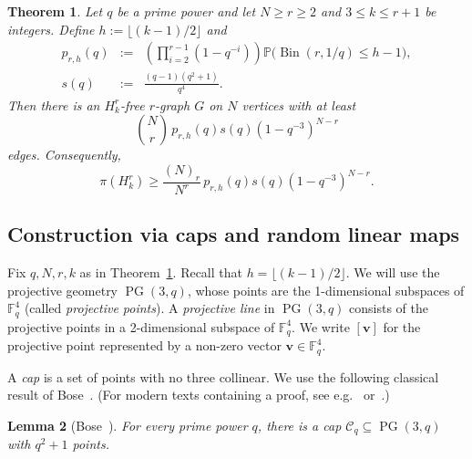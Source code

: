 \documentclass[10pt,a4paper]{article}
\numberwithin{equation}{section}
\newtheorem{theorem}{Theorem}[section]
\newtheorem{lemma}[theorem]{Lemma}
\theoremstyle{definition}
\theoremstyle{remark}
\newcommand{\V}[1]{\boldsymbol{#1}}
\begin{document}
\begin{theorem}\label{thm:poisson-finite}
	Let $q$ be a prime power and let $N\ge r\ge2$ and $3\le k\le r+1$ be integers. Define $h:=\lfloor (k-1)/2\rfloor$ and
	\begin{eqnarray*}
	p_{r,h}(q)&:=&\left(\prod_{i=2}^{r-1}(1-q^{-i})\right)
	\mathbb P\bigl(\operatorname{Bin}(r,1/q)\le h-1\bigr),\\
 s(q)&:=&\frac{(q-1)(q^2+1)}{q^4}.\end{eqnarray*} 
  Then there is an $H_k^r$-free $r$-graph $G$ on $N$ vertices with at least
	$$
	\binom Nr\,p_{r,h}(q)s(q)(1-q^{-3})^{N-r}
	$$
	edges. Consequently,
	\begin{equation}\label{eq:poisson-exact}
		\pi(H_k^r)\ge
		\frac{(N)_r}{N^r}\,p_{r,h}(q)s(q)(1-q^{-3})^{N-r}.
	\end{equation}
\end{theorem}

\subsection{Construction via caps and random linear maps}

Fix $q,N,r,k$ as in Theorem~\ref{thm:poisson-finite}. Recall that $h=\lfloor(k-1)/2\rfloor$. We will use the {projective geometry $\operatorname{PG}(3,q)$}, whose points are the 1-dimensional subspaces of $\mathbb F_q^4$ (called \emph{projective points}). A \emph{projective line} in $\operatorname{PG}(3,q)$ consists of the projective points in a 2-dimensional subspace of $\mathbb F_q^4$.
We write $[\V{v}]$ for the projective point represented by a non-zero vector $\V{v}\in\mathbb F_q^4$. 

A \emph{cap} is a set of points with no three collinear. We use the following classical result of Bose~\cite[Eq.~(5.60)]{Bose47}.
(For modern texts containing a proof, see e.g.~\cite[Theorem 4.36]{Ball15fgca} or~\cite[Proposition~2.6.6]{BrouwerVanmaldeghem22srg}.)


\begin{lemma}[Bose~\cite{Bose47}]\label{lem:cap}
    For every prime power $q$, there is a cap $\mathcal C_q\subseteq\operatorname{PG}(3,q)$ with $q^2+1$ points.
\end{lemma}
\end{document}
